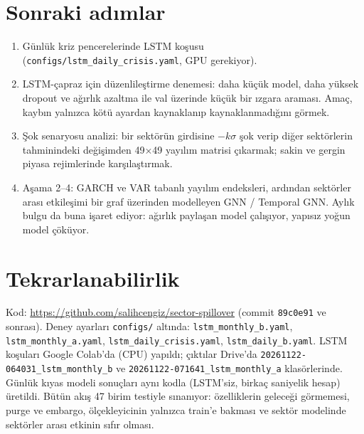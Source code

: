 \documentclass[11pt,a4paper]{article}
\begin{document}
\section{Sonraki adımlar}
\begin{enumerate}
  \item Günlük kriz pencerelerinde LSTM koşusu (\texttt{configs/lstm\_daily\_crisis.yaml}, GPU gerekiyor).
  \item LSTM-çapraz için düzenlileştirme denemesi: daha küçük model, daha yüksek dropout ve ağırlık azaltma ile val üzerinde
        küçük bir ızgara araması. Amaç, kaybın yalnızca kötü ayardan kaynaklanıp kaynaklanmadığını görmek.
  \item Şok senaryosu analizi: bir sektörün girdisine $-k\sigma$ şok verip diğer sektörlerin tahminindeki değişimden
        49$\times$49 yayılım matrisi çıkarmak; sakin ve gergin piyasa rejimlerinde karşılaştırmak.
  \item Aşama 2--4: GARCH ve VAR tabanlı yayılım endeksleri, ardından sektörler arası etkileşimi bir graf üzerinden modelleyen
        GNN / Temporal GNN. Aylık bulgu da buna işaret ediyor: ağırlık paylaşan model çalışıyor, yapısız yoğun model çöküyor.
\end{enumerate}

\section*{Tekrarlanabilirlik}
\small\sloppy
Kod: \url{https://github.com/salihcengiz/sector-spillover} (commit \texttt{89c0e91} ve sonrası). Deney ayarları
\texttt{configs/} altında: \texttt{lstm\_monthly\_b.yaml}, \texttt{lstm\_monthly\_a.yaml}, \texttt{lstm\_daily\_crisis.yaml},
\texttt{lstm\_daily\_b.yaml}. LSTM koşuları Google Colab'da (CPU) yapıldı; çıktılar Drive'da \texttt{20261122-064031\_lstm\_monthly\_b}
ve \texttt{20261122-071641\_lstm\_monthly\_a} klasörlerinde. Günlük kıyas modeli sonuçları aynı kodla (LSTM'siz, birkaç saniyelik
hesap) üretildi. Bütün akış 47 birim testiyle sınanıyor: özelliklerin geleceği görmemesi, purge ve embargo, ölçekleyicinin yalnızca
train'e bakması ve sektör modelinde sektörler arası etkinin sıfır olması.
\end{document}
